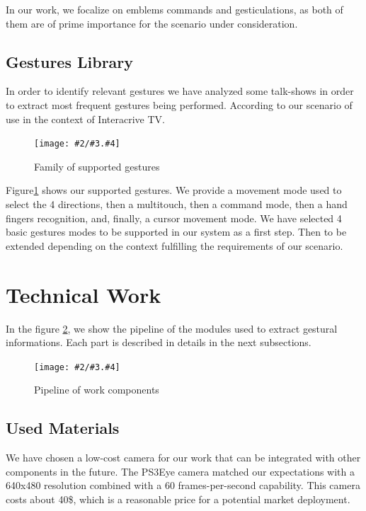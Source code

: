 \documentclass{llncs}
\newcommand{\imagepathext}[5]{%
\begin{figure}[!htbp]
\hfil\texttt{[image: \#2/\#3.\#4]}\hfil
\caption{#5\label{#3}}
\end{figure}}
\newcommand{\png}[2]{\imagepathext{width=\columnwidth}{pics}{#1}{png}{#2}}
\begin{document}
In our work, we focalize on emblems commands and gesticulations, as both of them are of prime importance for the scenario under consideration.

\subsection{Gestures Library}

In order to identify relevant gestures we have analyzed some talk-shows in order
to extract most frequent gestures being performed.
According to our scenario of use in the context of Interacrive TV.

\png{handg}{Family of supported gestures}

Figure\ref{handg} shows our supported gestures. We provide a movement mode
used to select the 4 directions, then a multitouch, then a command mode, then a hand fingers recognition,
and, finally, a cursor movement mode.
We have selected 4 basic gestures modes to be supported in our system as a first step.
Then to be extended depending on the context fulfilling the requirements
of our scenario.

\section{Technical Work}

In the figure \ref{pipeline}, we show the pipeline of the modules used to
extract gestural informations. Each part is described in details in the next
subsections.

\png{pipeline}{Pipeline of work components}

\subsection{Used Materials}
We have chosen a low-cost camera for our work that can be integrated with other components in the future.
The PS3Eye camera matched our expectations with a 640x480 resolution combined with a 60 frames-per-second capability.
This camera costs about 40\$, which is a reasonable price for a potential market deployment.
\end{document}
